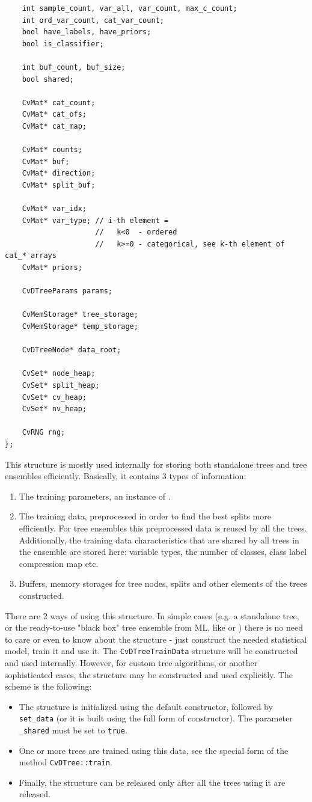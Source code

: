 \begin{lstlisting}
    int sample_count, var_all, var_count, max_c_count;
    int ord_var_count, cat_var_count;
    bool have_labels, have_priors;
    bool is_classifier;

    int buf_count, buf_size;
    bool shared;

    CvMat* cat_count;
    CvMat* cat_ofs;
    CvMat* cat_map;

    CvMat* counts;
    CvMat* buf;
    CvMat* direction;
    CvMat* split_buf;

    CvMat* var_idx;
    CvMat* var_type; // i-th element =
                     //   k<0  - ordered
                     //   k>=0 - categorical, see k-th element of cat_* arrays
    CvMat* priors;

    CvDTreeParams params;

    CvMemStorage* tree_storage;
    CvMemStorage* temp_storage;

    CvDTreeNode* data_root;

    CvSet* node_heap;
    CvSet* split_heap;
    CvSet* cv_heap;
    CvSet* nv_heap;

    CvRNG rng;
};
\end{lstlisting}


This structure is mostly used internally for storing both standalone trees and tree ensembles efficiently. Basically, it contains 3 types of information:
\begin{enumerate}
\item{The training parameters, an instance of .}
\item{The training data, preprocessed in order to find the best splits more efficiently. For tree ensembles this preprocessed data is reused by all the trees. Additionally, the training data characteristics that are shared by all trees in the ensemble are stored here: variable types, the number of classes, class label compression map etc.}
\item{Buffers, memory storages for tree nodes, splits and other elements of the trees constructed.}
\end{enumerate}
There are 2 ways of using this structure. In simple cases (e.g. a standalone tree, or the ready-to-use "black box" tree ensemble from ML, like  or ) there is no need to care or even to know about the structure - just construct the needed statistical model, train it and use it. The \texttt{CvDTreeTrainData} structure will be constructed and used internally. However, for custom tree algorithms, or another sophisticated cases, the structure may be constructed and used explicitly. The scheme is the following:
\begin{itemize}
\item The structure is initialized using the default constructor, followed by \texttt{set\_data} (or it is built using the full form of constructor). The parameter \texttt{\_shared} must be set to \texttt{true}.
\item One or more trees are trained using this data, see the special form of the method \texttt{CvDTree::train}.
\item Finally, the structure can be released only after all the trees using it are released.
\end{itemize}


